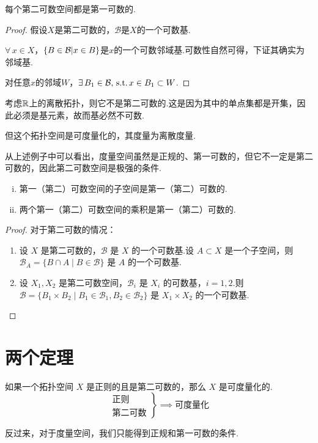 \begin{proposition}
    每个第二可数空间都是第一可数的.
\end{proposition}
\begin{proof}
    假设$X$是第二可数的，$\mathcal{B}$是$X$的一个可数基.\par
    $\forall\, x\in X$，$\{B\in\mathcal{B}|x\in B\}$是$x$的一个可数邻域基.可数性自然可得，下证其确实为邻域基.\par
    对任意$x$的邻域$W$，$\exists\, B_1\in\mathcal{B},\operatorname{\,\text{s.t.}} x\in B_1\subset W$.
\end{proof}

\begin{instance}
    考虑$\mathbb{R}$上的离散拓扑，则它不是第二可数的.这是因为其中的单点集都是开集，因此必须是基元素，故而基必然不可数.\par
    但这个拓扑空间是可度量化的，其度量为离散度量.\par
\end{instance}
从上述例子中可以看出，度量空间虽然是正规的、第一可数的，但它不一定是第二可数的，因此第二可数空间是极强的条件.\par

\begin{proposition}
    \begin{enumerate}[(i)]
        \item 第一（第二）可数空间的子空间是第一（第二）可数的.
        \item 两个第一（第二）可数空间的乘积是第一（第二）可数的.
    \end{enumerate}
\end{proposition}
\begin{proof}
    对于第二可数的情况：
    \begin{enumerate}
        \item[(i)] 设 $X$ 是第二可数的，$\mathcal{B}$ 是 $X$ 的一个可数基.设 $A \subset X$ 是一个子空间，则 $\mathcal{B}_A = \{B \cap A \mid B \in \mathcal{B}\}$ 是 $A$ 的一个可数基.
        \item[(ii)] 设 $X_1, X_2$ 是第二可数空间，$\mathcal{B}_i$ 是 $X_i$ 的可数基，$i=1,2$.则 $\mathcal{B} = \{B_1 \times B_2 \mid B_1 \in \mathcal{B}_1, B_2 \in \mathcal{B}_2\}$ 是 $X_1 \times X_2$ 的一个可数基.
    \end{enumerate}
\end{proof}

\section{两个定理}
\begin{theorem}
    如果一个拓扑空间 $X$ 是正则的且是第二可数的，那么 $X$ 是可度量化的.
    \[
        \left.
        \begin{array}{r}
            \text{正则} \\
            \text{第二可数}
        \end{array}
        \right\} \implies \text{可度量化}
    \]
\end{theorem}
反过来，对于度量空间，我们只能得到正规和第一可数的条件.

